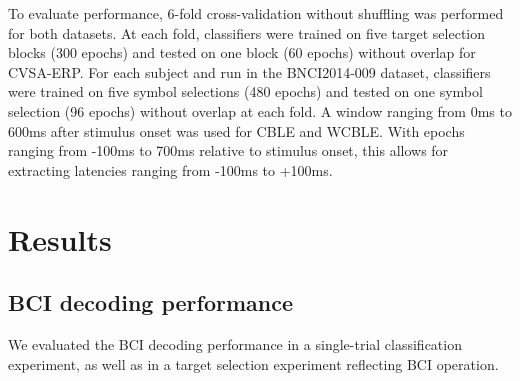 To evaluate performance, 6-fold cross-validation without shuffling was performed for both
datasets.
At each fold, classifiers were trained on five target selection blocks (300
epochs) and tested on one block (60 epochs) without overlap for CVSA-ERP.
For each subject and run in the BNCI2014-009 dataset, classifiers
were trained on five symbol selections (480 epochs) and tested on one symbol
selection (96 epochs) without overlap at each fold.
A window ranging from 0ms to 600ms after stimulus onset was used for CBLE and WCBLE.
With epochs ranging from -100ms to 700ms relative to stimulus onset, this
allows for extracting latencies ranging from -100ms to +100ms.



\section{Results}

\subsection{BCI decoding performance}
\label{sec:block_accuracy}

We evaluated the BCI decoding performance in a single-trial classification
experiment, as well as in a target selection experiment reflecting BCI
operation.

